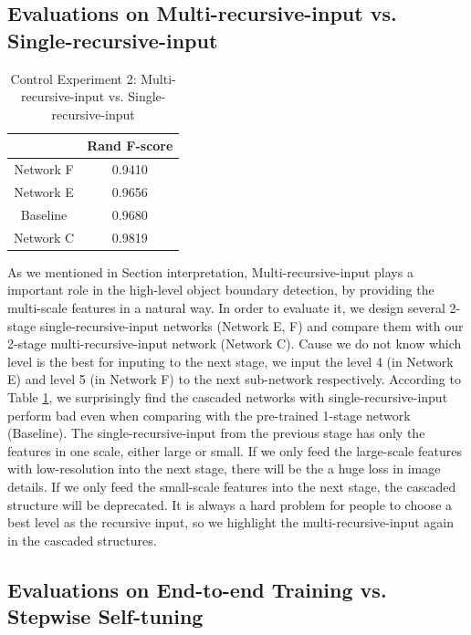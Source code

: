 \documentclass[senior]{IPSstyle}
\begin{document}
\subsection{Evaluations on Multi-recursive-input vs. Single-recursive-input}

\begin{table}[t]
\renewcommand{\arraystretch}{0.6}
\caption{Control Experiment 2: Multi-recursive-input vs. Single-recursive-input}
\label{outcome}
\begin{center}
\begin{tabular}{|c|c|}
\hline
&\multicolumn{1}{c|}{Rand F-score}\\
\hline
Network F 		& 0.9410 	\\	\hline
Network E			& 0.9656	 \\	\hline
Baseline	 		& 0.9680	\\	\hline
Network C 		& 0.9819	\\	\hline
\end{tabular}
\end{center}
\label{control_experiment_2}
\end{table}

As we mentioned in Section {interpretation}, Multi-recursive-input plays a important role in the high-level object boundary detection, by providing the multi-scale features in a natural way. In order to evaluate it, we design several 2-stage single-recursive-input networks (Network E, F) and compare them with our 2-stage multi-recursive-input network (Network C). Cause we do not know which level is the best for inputing to the next stage, we input the level 4 (in Network E) and level 5 (in Network F) to the next sub-network respectively. According to Table \ref{control_experiment_2}, we surprisingly find the cascaded networks with single-recursive-input perform bad even when comparing with the pre-trained 1-stage network (Baseline). The single-recursive-input from the previous stage has only the features in one scale, either large or small. If we only feed the large-scale features with low-resolution into the next stage, there will be the a huge loss in image details. If we only feed the small-scale features into the next stage, the cascaded structure will be deprecated. It is always a hard problem for people to choose a best level as the recursive input, so we highlight the multi-recursive-input again in the cascaded structures.

\subsection{Evaluations on End-to-end Training vs. Stepwise Self-tuning}
\end{document}
